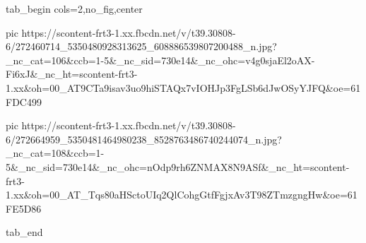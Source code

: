  
 
 
 
 


\ifcmt
  tab_begin cols=2,no_fig,center

     pic https://scontent-frt3-1.xx.fbcdn.net/v/t39.30808-6/272460714_5350480928313625_608886539807200488_n.jpg?_nc_cat=106&ccb=1-5&_nc_sid=730e14&_nc_ohc=v4g0sjaEl2oAX-Fi6xJ&_nc_ht=scontent-frt3-1.xx&oh=00_AT9CTa9isav3uo9hiSTAQx7vIOHJp3FgLSb6dJwOSyYJFQ&oe=61FDC499

     pic https://scontent-frt3-1.xx.fbcdn.net/v/t39.30808-6/272664959_5350481464980238_8528763486740244074_n.jpg?_nc_cat=108&ccb=1-5&_nc_sid=730e14&_nc_ohc=nOdp9rh6ZNMAX8N9ASf&_nc_ht=scontent-frt3-1.xx&oh=00_AT_Tqs80aHSctoUIq2QlCohgGtfFgjxAv3T98ZTmzgngHw&oe=61FE5D86

  tab_end
\fi
